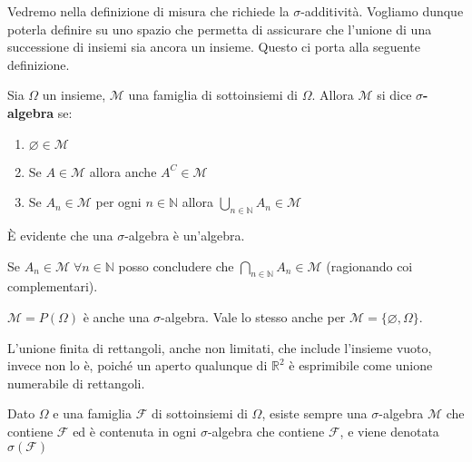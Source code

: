 Vedremo nella definizione di misura che richiede la \(\sigma\)-additività.
Vogliamo dunque poterla definire su uno spazio che permetta di assicurare che
l'unione di una successione di insiemi sia ancora un insieme. Questo ci porta
alla seguente definizione.

\begin{definition}
    Sia \(\Omega\) un insieme, \(\mathcal{M}\) una famiglia di sottoinsiemi di
    \(\Omega\). Allora \(\mathcal{M}\) si dice \textbf{\(\sigma\)-algebra} se:
\begin{enumerate}[label = \arabic*.]
    \item \(\varnothing \in \mathcal{M}\) 
    \item Se \(A \in \mathcal{M}\) allora anche \(A^{C}\in \mathcal{M}\) 
    \item Se \(A_{n} \in \mathcal{M}\) per ogni \(n \in \mathbb{N}\) allora
        \(\bigcup_{n \in \mathbb{N}} A_{n} \in \mathcal{M}\) 
\end{enumerate}
\end{definition}
\begin{remark}
    È evidente che una \(\sigma\)-algebra è un'algebra.
\end{remark}
\begin{remark}
    Se \(A_{n} \in \mathcal{M} \; \forall n \in \mathbb{N}\) posso concludere che
    \(\bigcap_{n \in \mathbb{N}} A_{n} \in \mathcal{M} \) (ragionando coi complementari).
\end{remark}

\begin{example}
    \(\mathcal{M} = P(\Omega)\) è anche una \(\sigma\)-algebra. Vale lo stesso
    anche per \(\mathcal{M} = \{\varnothing, \Omega\} \).
\end{example}
\begin{example}
    L'unione finita di rettangoli, anche non limitati, che include l'insieme
    vuoto, invece non lo è, poiché un aperto qualunque di \(\mathbb{R}^{2}\) è
    esprimibile come unione numerabile di rettangoli.
\end{example}

\newpage
\begin{theorem}

Dato \(\Omega\) e una famiglia \(\mathcal{F}\) di sottoinsiemi di \(\Omega\),
esiste sempre una \(\sigma\)-algebra \(\mathcal{M}\) che contiene
\(\mathcal{F}\) ed è contenuta in ogni \(\sigma\)-algebra che contiene
\(\mathcal{F}\), e viene denotata \(\sigma(\mathcal{F})\)

\end{theorem}

